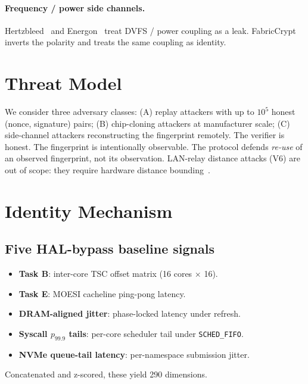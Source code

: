 \documentclass[11pt,letterpaper]{article}
\begin{document}
\paragraph{Frequency / power side channels.}
Hertzbleed~\cite{Hertzbleed2022} and Energon~\cite{Energon2025} treat
DVFS / power coupling as a leak. FabricCrypt inverts the polarity and
treats the same coupling as identity.

\section{Threat Model}

We consider three adversary classes:
(A) replay attackers with up to $10^5$ honest (nonce, signature) pairs;
(B) chip-cloning attackers at manufacturer scale;
(C) side-channel attackers reconstructing the fingerprint remotely.
The verifier is honest. The fingerprint is intentionally observable.
The protocol defends \emph{re-use} of an observed fingerprint, not
its observation. LAN-relay distance attacks (V6) are out of scope:
they require hardware distance bounding~\cite{Brands1993}.

\section{Identity Mechanism}

\subsection{Five HAL-bypass baseline signals}
\begin{itemize}[noitemsep,topsep=2pt]
\item \textbf{Task B}: inter-core TSC offset matrix (16 cores $\times$ 16).
\item \textbf{Task E}: MOESI cacheline ping-pong latency.
\item \textbf{DRAM-aligned jitter}: phase-locked latency under refresh.
\item \textbf{Syscall $p_{99.9}$ tails}: per-core scheduler tail
      under \texttt{SCHED\_FIFO}.
\item \textbf{NVMe queue-tail latency}: per-namespace submission jitter.
\end{itemize}
Concatenated and z-scored, these yield 290 dimensions.
\end{document}
